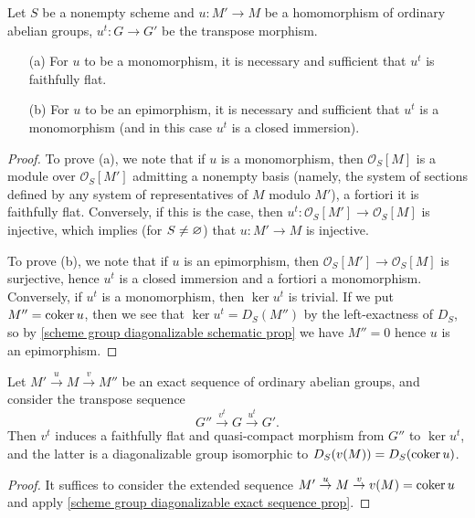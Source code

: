 \begin{corollary}\label{scheme group diagonalizable transpose mono epi iff}
Let $S$ be a nonempty scheme and $u:M'\to M$ be a homomorphism of ordinary abelian groups, $u^t:G\to G'$ be the transpose morphism.
\begin{enumerate}
    \item[(a)] For $u$ to be a monomorphism, it is necessary and sufficient that $u^t$ is faithfully flat.
    \item[(b)] For $u$ to be an epimorphism, it is necessary and sufficient that $u^t$ is a monomorphism (and in this case $u^t$ is a closed immersion).
\end{enumerate}
\end{corollary}
\begin{proof}
To prove (a), we note that if $u$ is a monomorphism, then $\mathscr{O}_S[M]$ is a module over $\mathscr{O}_S[M']$ admitting a nonempty basis (namely, the system of sections defined by any system of representatives of $M$ modulo $M'$), a fortiori it is faithfully flat. Conversely, if this is the case, then $u^t:\mathscr{O}_S[M']\to\mathscr{O}_S[M]$ is injective, which implies (for $S\neq\varnothing$) that $u:M'\to M$ is injective.\par
To prove (b), we note that if $u$ is an epimorphism, then $\mathscr{O}_S[M']\to\mathscr{O}_S[M]$ is surjective, hence $u^t$ is a closed immersion and a fortiori a monomorphism. Conversely, if $u^t$ is a monomorphism, then $\ker u^t$ is trivial. If we put $M''=\operatorname{coker} u$, then we see that $\ker u^t=D_S(M'')$ by the left-exactness of $D_S$, so by \cref{scheme group diagonalizable schematic prop} we have $M''=0$ hence $u$ is an epimorphism.
\end{proof}

\begin{corollary}
Let $M'\stackrel{u}{\to} M\stackrel{v}{\to}M''$ be an exact sequence of ordinary abelian groups, and consider the transpose sequence
\[G''\stackrel{v^t}{\longrightarrow}G\stackrel{u^t}{\longrightarrow}G'.\]
Then $v^t$ induces a faithfully flat and quasi-compact morphism from $G''$ to $\ker u^t$, and the latter is a diagonalizable group isomorphic to $D_S(v(M))=D_S(\operatorname{coker} u)$.
\end{corollary}
\begin{proof}
It suffices to consider the extended sequence $M'\stackrel{u}{\to} M\stackrel{v}{\to}v(M)=\operatorname{coker} u$ and apply \cref{scheme group diagonalizable exact sequence prop}. 
\end{proof}

